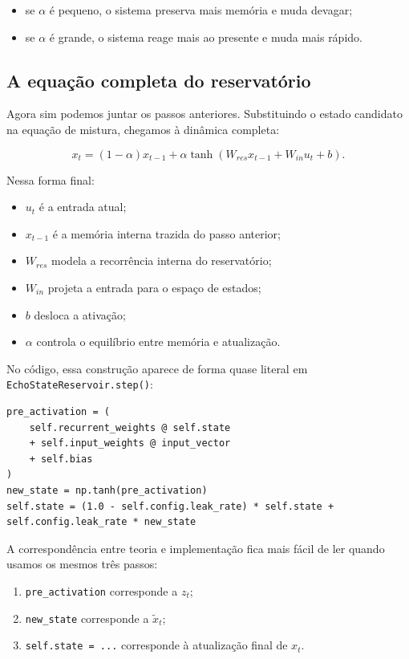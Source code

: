 \documentclass[12pt]{article}
\providecommand{\tightlist}{%
              \setlength{\itemsep}{0pt}\setlength{\parskip}{0pt}}
\begin{document}
\begin{itemize}
\tightlist
\item
  se \(\alpha\) é pequeno, o sistema preserva mais memória e muda devagar;
\item
  se \(\alpha\) é grande, o sistema reage mais ao presente e muda mais rápido.
\end{itemize}

\subsection{A equação completa do reservatório}\label{35-a-equauxe7uxe3o-completa-do-reservatuxf3rio}

Agora sim podemos juntar os passos anteriores. Substituindo o estado candidato na equação de mistura, chegamos à dinâmica completa:

\[
x_t = (1 - \alpha) x_{t-1} + \alpha \tanh(W_{res} x_{t-1} + W_{in} u_t + b).
\]

Nessa forma final:

\begin{itemize}
\tightlist
\item
  \(u_t\) é a entrada atual;
\item
  \(x_{t-1}\) é a memória interna trazida do passo anterior;
\item
  \(W_{res}\) modela a recorrência interna do reservatório;
\item
  \(W_{in}\) projeta a entrada para o espaço de estados;
\item
  \(b\) desloca a ativação;
\item
  \(\alpha\) controla o equilíbrio entre memória e atualização.
\end{itemize}

No código, essa construção aparece de forma quase literal em \texttt{EchoStateReservoir.step()}:

\begin{verbatim}
pre_activation = (
    self.recurrent_weights @ self.state
    + self.input_weights @ input_vector
    + self.bias
)
new_state = np.tanh(pre_activation)
self.state = (1.0 - self.config.leak_rate) * self.state + self.config.leak_rate * new_state
\end{verbatim}

A correspondência entre teoria e implementação fica mais fácil de ler quando usamos os mesmos três passos:

\begin{enumerate}
\def\labelenumi{\arabic{enumi}.}
\tightlist
\item
  \texttt{pre\_activation} corresponde a \(z_t\);
\item
  \texttt{new\_state} corresponde a \(\widetilde{x}_t\);
\item
  \texttt{self.state\ =\ ...} corresponde à atualização final de \(x_t\).
\end{enumerate}
\end{document}
